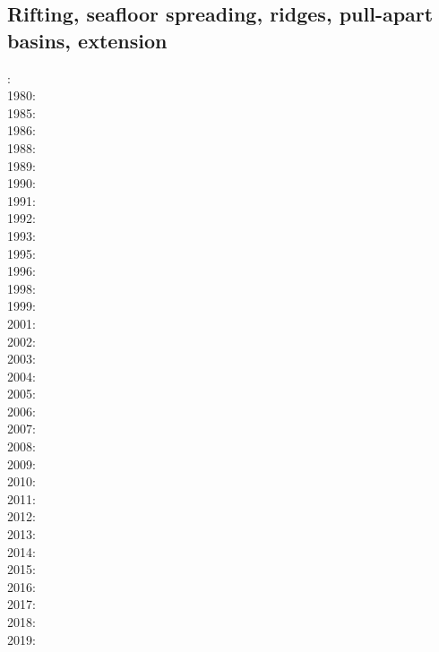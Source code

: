 \subsection*{Rifting, seafloor spreading, ridges, pull-apart basins, extension}

: \cite{froi73}\\
1980: \cite{bran80}\\
1985: \cite{bosw85}\\
1986: \cite{hoen86b}\cite{zupf86}\cite{zupa86}\cite{mofr86}\\
1988: \cite{bums88}\\
1989: \cite{mewi89}\\
1990: \cite{fara90}\\
1991: \cite{trbr91}\cite{buck91}\\
1992: \cite{zieg92b}\cite{egan92}\\
1993: \cite{gowo93}\\
1995: \cite{gowo95}\\
1996: \cite{dusa96}\cite{beda96}\cite{mada96}\\
1998: \cite{rafm98}\\
1999: \cite{brun99}\cite{bulp99}\cite{gowo99}\\
2001: \cite{hupc01}\cite{hupc01b}\cite{frbr01}\cite{frnb01a}\cite{frnb01b}\\
2002: \cite{hube02}\cite{hani02}\cite{dabm02}\cite{vacl02}\cite{belz02}\\
2003: \cite{hube03}\cite{hani03}\cite{covb03}\\
2004: \cite{hier04}\\
2005: \cite{hubb05}\cite{coub05}\cite{vanw05}\cite{vabl05}\\
2006: \cite{tibs06}\cite{coma06}\cite{crwy06}\\
2007: \cite{huha07}\cite{macl07}\cite{vabl07}\\
2008: \cite{cort08}\cite{gumb08}\\
2009: \cite{agcz09}\cite{kekj09}\\
2010: \cite{aubh10}\cite{gery10}\cite{fosr10}\cite{gerya2010}\\
2011: \cite{alht11}\cite{ellw11}\\
2012: \cite{alht12}\cite{brps12}\\
2013: \cite{alhf13}\cite{brau13}\cite{chbe13}\cite{knak13}\cite{kern13}\cite{mipf13}\cite{wabd13}
      \cite{gery13}\cite{ligw13}\cite{gery13c}\\
2014: \cite{hebr14}\cite{lige14}\cite{brun14}\cite{kobf14}\cite{ebva14}\cite{puge14}\cite{lige14b}\\
2015: \cite{nabu15}\cite{clbq15}\\
2016: \cite{olbm16}\cite{jekm16}\cite{zwsn16}\\
2017: \cite{lemh17}\cite{brcr17}\cite{bekb17}\cite{nabp17}\\
2018: \cite{chsm18}\cite{brwm18}\cite{brun18}\\
2019: \cite{lisp19}\cite{zwsb19}\cite{anpa19}\cite{dual19}\cite{mocb19}


